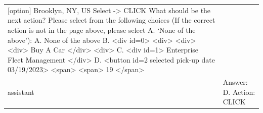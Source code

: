 \begin{center}
\begin{longtable}{lp{11.5cm}}
    [option]  Brooklyn, NY, US Select -> CLICK\newline
    What should be the next action? Please select from the following choices (If the correct action is not in the page above, please select A. `None of the above'):\newline\newline
    A. None of the above\newline
    B. <div id=0> <div> <div> <div> Buy A Car </div> <div>\newline
    C. <div id=1> Enterprise Fleet Management </div>\newline
    D. <button id=2 selected pick-up date 03/19/2023> <span> <span> 19 </span>\\\addlinespace
    assistant&
    Answer: D.\newline
    Action: CLICK\\
    \bottomrule
    \end{longtable}
\end{center}